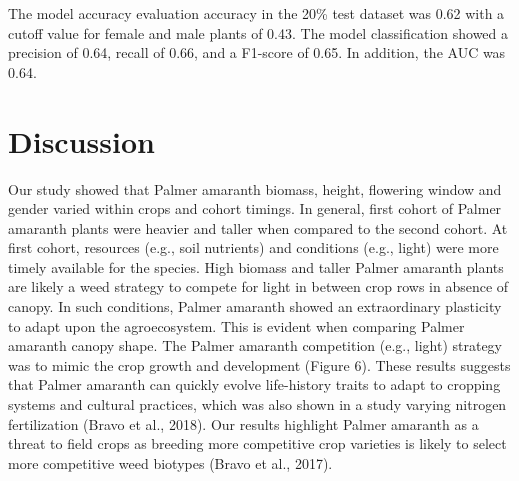 \documentclass[utf8]{frontiersSCNS}
\begin{document}
The model accuracy evaluation accuracy in the 20\% test dataset was 0.62
with a cutoff value for female and male plants of 0.43. The model
classification showed a precision of 0.64, recall of 0.66, and a
F1-score of 0.65. In addition, the AUC was 0.64.

\hypertarget{discussion}{%
\section*{Discussion}\label{discussion}}

Our study showed that Palmer amaranth biomass, height, flowering window
and gender varied within crops and cohort timings. In general, first
cohort of Palmer amaranth plants were heavier and taller when compared
to the second cohort. At first cohort, resources (e.g., soil nutrients)
and conditions (e.g., light) were more timely available for the species.
High biomass and taller Palmer amaranth plants are likely a weed
strategy to compete for light in between crop rows in absence of canopy.
In such conditions, Palmer amaranth showed an extraordinary plasticity
to adapt upon the agroecosystem. This is evident when comparing Palmer
amaranth canopy shape. The Palmer amaranth competition (e.g., light)
strategy was to mimic the crop growth and development (Figure 6). These
results suggests that Palmer amaranth can quickly evolve life-history
traits to adapt to cropping systems and cultural practices, which was
also shown in a study varying nitrogen fertilization (Bravo et al.,
2018). Our results highlight Palmer amaranth as a threat to field crops
as breeding more competitive crop varieties is likely to select more
competitive weed biotypes (Bravo et al., 2017).
\end{document}
